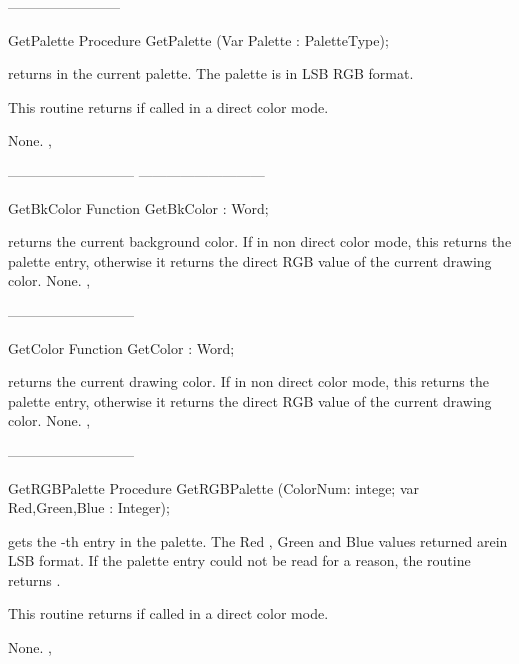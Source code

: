 ------------------------
\begin{procedure}{GetPalette}
\Declaration
Procedure GetPalette (Var Palette : PaletteType);

\Description
{} returns in  the current palette. The palette
is in LSB RGB format.

This routine returns  if called in a direct color mode.

\Errors
None.
\SeeAlso
{}, 
\end{procedure}
---------------------------
---------------------------
\begin{function}{GetBkColor}
\Declaration
Function GetBkColor  : Word;

\Description
{} returns the current background color. If in non direct color
mode, this returns the palette entry, otherwise it returns the direct
RGB value of the current drawing color.
\Errors
None.
\SeeAlso
{},
\end{function}
---------------------------
\begin{function}{GetColor}
\Declaration
Function GetColor  : Word;

\Description
{} returns the current drawing color. If in non direct color
mode, this returns the palette entry, otherwise it returns the direct
RGB value of the current drawing color.
\Errors
None.
\SeeAlso
{},
\end{function}
---------------------------
\begin{procedure}{GetRGBPalette}
\Declaration
Procedure GetRGBPalette (ColorNum: intege; var Red,Green,Blue : Integer);

\Description
{} gets the -th entry in the palette.
The Red , Green and Blue values returned arein LSB format.
If the palette entry could not be read for a reason,
the routine returns .

This routine returns  if called in a direct color mode.

\Errors
None.
\SeeAlso
{},
\end{procedure}

